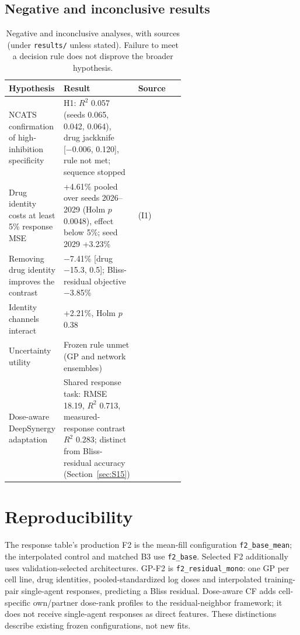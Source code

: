 \documentclass[11pt]{article}
\begin{document}
\begin{samepage}
\section{Negative and inconclusive results}\label{sec:S13}
\begin{table}[H]
\caption{Negative and inconclusive analyses, with sources (under \texttt{results/} unless stated). Failure to meet a decision rule does not disprove the broader hypothesis.}\label{tab:S13}
\centering\small
\begin{tabularx}{\linewidth}{@{}P{0.24\linewidth} P{0.36\linewidth} L@{}}
\toprule
Hypothesis & Result & Source \\
\midrule
NCATS confirmation of high-inhibition specificity & H1: $R^2$ 0.057 (seeds 0.065, 0.042, 0.064), drug jackknife [−0.006, 0.120], rule not met; sequence stopped &  \\
Drug identity costs at least 5\% response MSE & +4.61\% pooled over seeds 2026–2029 (Holm $p$ 0.0048), effect below 5\%; seed 2029 +3.23\% &  (I1) \\
Removing drug identity improves the contrast & −7.41\% [drug −15.3, 0.5]; Bliss-residual objective −3.85\% &  \\
Identity channels interact & +2.21\%, Holm $p$ 0.38 &  \\
Uncertainty utility & Frozen rule unmet (GP and network ensembles) &  \\
Dose-aware DeepSynergy adaptation & Shared response task: RMSE 18.19, $R^2$ 0.713, measured-response contrast $R^2$ 0.283; distinct from Bliss-residual accuracy (Section~\ref{sec:S15}) &  \\
\bottomrule
\end{tabularx}
\end{table}
\end{samepage}
\section{Reproducibility}\label{sec:S14}
The response table's production F2 is the mean-fill configuration \texttt{f2\_base\_mean}; the interpolated control and matched B3 use \texttt{f2\_base}. Selected F2 additionally uses validation-selected architectures. GP-F2 is \texttt{f2\_residual\_mono}: one GP per cell line, drug identities, pooled-standardized log doses and interpolated training-pair single-agent responses, predicting a Bliss residual. Dose-aware CF adds cell-specific own/partner dose-rank profiles to the residual-neighbor framework; it does not receive single-agent responses as direct features. These distinctions describe existing frozen configurations, not new fits.
\end{document}
